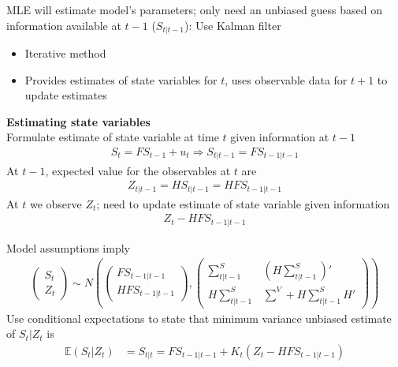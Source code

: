 \documentclass{beamer}
\begin{document}
\begin{frame}
  MLE will estimate model's parameters; only need an unbiased guess based on information available at $t-1$ ($S_{t|t-1}$): Use Kalman filter 
  \begin{itemize}
    \item Iterative method
    \item Provides estimates of state variables for $t$, uses observable data for $t+1$ to update estimates
  \end{itemize}
\end{frame}

\begin{frame}
  \textbf{Estimating state variables}\\ Formulate estimate of state variable at time $t$ given information at $t-1$
  \begin{align}
    S_t=FS_{t-1}+u_t \Rightarrow S_{t|t-1}=FS_{t-1|t-1}
  \end{align}
  At $t-1$, expected value for the observables at $t$ are
  \begin{align}
    Z_{t|t-1}=HS_{t|t-1}=HFS_{t-1|t-1}
  \end{align}
  At $t$ we observe $Z_t$; need to update estimate of state variable given information
  \begin{align}
     Z_t-HFS_{t-1|t-1}
   \end{align} 
\end{frame}

\begin{frame}
  Model assumptions imply
  \begin{align}
    \begin{pmatrix}      S_t \\ Z_t     \end{pmatrix} \sim N \left( 
    \begin{pmatrix}      FS_{t-1|t-1} \\HFS_{t-1|t-1}    \end{pmatrix},
    \begin{pmatrix}      \sum^S_{t|t-1} & \left( H\sum^S_{t|t-1} \right)' \\ H\sum^S_{t|t-1} & \sum^V+H\sum^S_{t|t-1}H' \end{pmatrix} \right)
  \end{align}
  \medskip
  Use conditional expectations to state that minimum variance unbiased estimate of $S_t|Z_t$ is
  \begin{align}
     \mathbb{E}(S_t|Z_t)&=S_{t|t}=FS_{t-1|t-1}+K_t(Z_t-HFS_{t-1|t-1})     
  \end{align}  
\end{frame}
\end{document}
